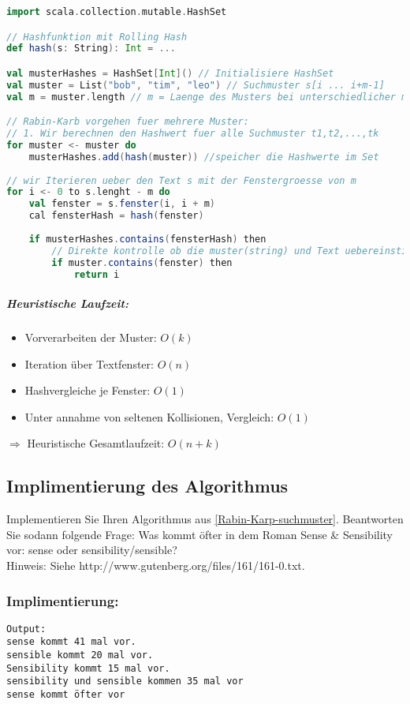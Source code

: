 \begin{lstlisting}[language=Scala]
import scala.collection.mutable.HashSet

// Hashfunktion mit Rolling Hash 
def hash(s: String): Int = ...

val musterHashes = HashSet[Int]() // Initialisiere HashSet
val muster = List("bob", "tim", "leo") // Suchmuster s[i ... i+m-1]
val m = muster.length // m = Laenge des Musters bei unterschiedlicher musterlaenge sollte m die wenigsten charaktere haben

// Rabin-Karb vorgehen fuer mehrere Muster:
// 1. Wir berechnen den Hashwert fuer alle Suchmuster t1,t2,...,tk
for muster <- muster do
	musterHashes.add(hash(muster)) //speicher die Hashwerte im Set
	
// wir Iterieren ueber den Text s mit der Fenstergroesse von m
for i <- 0 to s.lenght - m do
	val fenster = s.fenster(i, i + m)
	cal fensterHash = hash(fenster)
	
	if musterHashes.contains(fensterHash) then
		// Direkte kontrolle ob die muster(string) und Text uebereinstimmen
		if muster.contains(fenster) then
			return i
\end{lstlisting}

\subparagraph{Heuristische Laufzeit:}
\begin{itemize}
	\item Vorverarbeiten der Muster: $O(k)$
	\item Iteration über Textfenster: $O(n)$
	\item Hashvergleiche je Fenster: $O(1)$
	\item Unter annahme von seltenen Kollisionen, Vergleich: $O(1)$
\end{itemize}
$\Rightarrow$ Heuristische Gesamtlaufzeit: $O(n+k)$

\newpage
\subsection{Implimentierung des Algorithmus}
Implementieren Sie Ihren Algorithmus aus \ref{Rabin-Karp-suchmuster}. Beantworten Sie sodann folgende Frage: Was kommt öfter in dem Roman Sense \& Sensibility vor: sense oder sensibility/sensible?\\
Hinweis: Siehe http://www.gutenberg.org/files/161/161-0.txt.

\subsubsection{Implimentierung:}



\begin{verbatim}
Output:
sense kommt 41 mal vor.
sensible kommt 20 mal vor.
Sensibility kommt 15 mal vor.
sensibility und sensible kommen 35 mal vor
sense kommt öfter vor
\end{verbatim}


